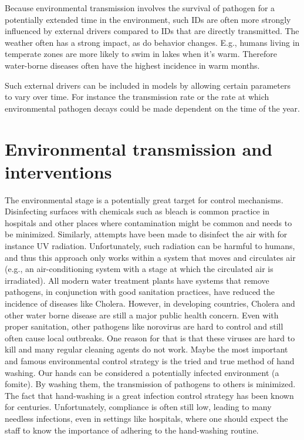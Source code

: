 \documentclass[
]{book}
\begin{document}
Because environmental transmission involves the survival of pathogen for a potentially extended time in the environment, such IDs are often more strongly influenced by external drivers compared to IDs that are directly transmitted. The weather often has a strong impact, as do behavior changes. E.g., humans living in temperate zones are more likely to swim in lakes when it's warm. Therefore water-borne diseases often have the highest incidence in warm months.

Such external drivers can be included in models by allowing certain parameters to vary over time. For instance the transmission rate or the rate at which environmental pathogen decays could be made dependent on the time of the year.

\hypertarget{environmental-transmission-and-interventions}{%
\section{Environmental transmission and interventions}\label{environmental-transmission-and-interventions}}

The environmental stage is a potentially great target for control mechanisms. Disinfecting surfaces with chemicals such as bleach is common practice in hospitals and other places where contamination might be common and needs to be minimized. Similarly, attempts have been made to disinfect the air with for instance UV radiation. Unfortunately, such radiation can be harmful to humans, and thus this approach only works within a system that moves and circulates air (e.g., an air-conditioning system with a stage at which the circulated air is irradiated). All modern water treatment plants have systems that remove pathogens, in conjunction with good sanitation practices, have reduced the incidence of diseases like Cholera. However, in developing countries, Cholera and other water borne disease are still a major public health concern. Even with proper sanitation, other pathogens like norovirus are hard to control and still often cause local outbreaks. One reason for that is that these viruses are hard to kill and many regular cleaning agents do not work.
Maybe the most important and famous environmental control strategy is the tried and true method of hand washing. Our hands can be considered a potentially infected environment (a fomite). By washing them, the transmission of pathogens to others is minimized. The fact that hand-washing is a great infection control strategy has been known for centuries. Unfortunately, compliance is often still low, leading to many needless infections, even in settings like hospitals, where one should expect the staff to know the importance of adhering to the hand-washing routine.
\end{document}
